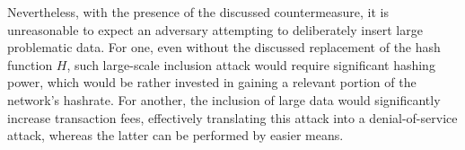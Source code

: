 \documentclass[a4paper,11pt,titlepage]{scrbook}
\begin{document}


Nevertheless, with the presence of the discussed countermeasure, it is unreasonable to expect an adversary attempting to deliberately insert large problematic data.
For one, even without the discussed replacement of the hash function $H$, such large-scale inclusion attack would require significant hashing power, which would be rather invested in gaining a relevant portion of the network's hashrate.
For another, the inclusion of large data would significantly increase transaction fees, effectively translating this attack into a denial-of-service attack, whereas the latter can be performed by easier means.





\backmatter

 \label{listoffig}
\listoffigures
\cleardoublepage
{} \label{listoftab}
\listoftables

\cleardoublepage
{} \label{biblio}
\printbibliography[title=References]

												  

%
\end{document}
